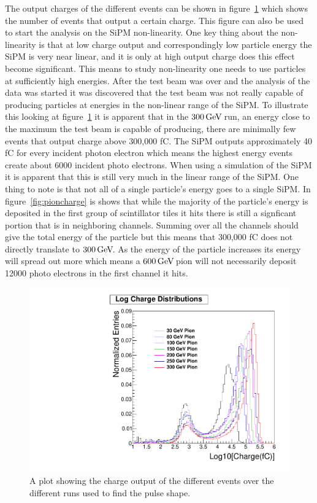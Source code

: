 The output charges of the different events can be shown in figure~\ref{fig:Log} which shows the number of events that output a certain charge. This figure can also be used to start the analysis on the SiPM non-linearity. One key thing about the non-linearity is that at low charge output and correspondingly low particle energy the SiPM is very near linear, and it is only at high output charge does this effect become significant. This means to study non-linearity one needs to use particles at sufficiently high energies. After the test beam was over and the analysis of the data was started it was discovered that the test beam was not really capable of producing particles at energies in the non-linear range of the SiPM. To illustrate this looking at figure~\ref{fig:Log} it is apparent that in the $300{\,\text{Ge\hspace{-.08em}V\hspace{-0.16em}}}$ run, an energy close to the maximum the test beam is capable of producing, there are minimally few events that output charge above 300,000 fC. The SiPM outputs approximately 40 fC for every incident photon electron which means the highest energy events create about 6000 incident photo electrons. When using a simulation of the SiPM it is apparent that this is still very much in the linear range of the SiPM. One thing to note is that not all of a single particle's energy goes to a single SiPM. In figure~\ref{fig:pioncharge} is shows that while the majority of the particle's energy is deposited in the first group of scintillator tiles it hits there is still a signficant portion that is in neighboring channels. Summing over all the channels should give the total energy of the particle but this means that 300,000 fC does not directly translate to $300{\,\text{Ge\hspace{-.08em}V\hspace{-0.16em}}}$. As the energy of the particle increases its energy will spread out more which means a $600{\,\text{Ge\hspace{-.08em}V\hspace{-0.16em}}}$ pion will not necessarily deposit 12000 photo electrons in the first channel it hits.

\begin{figure}
\centering
\includegraphics[width=0.8\linewidth]{Figures/Logplot.pdf}
\caption{A plot showing the charge output of the different events over the different runs used to find the pulse shape.}
\label{fig:Log}
\end{figure}
